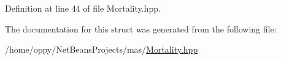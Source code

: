 Definition at line 44 of file Mortality.\-hpp.



The documentation for this struct was generated from the following file\-:\begin{DoxyCompactItemize}
\item 
/home/oppy/\-Net\-Beans\-Projects/mas/\hyperlink{_mortality_8hpp}{Mortality.\-hpp}\end{DoxyCompactItemize}
